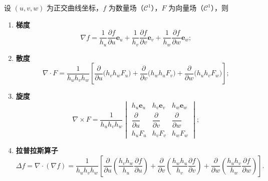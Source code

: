 \begin{theorem}[微分算子的一般公式]
设 \((u,v,w)\) 为正交曲线坐标，\(f\) 为数量场（\(\mathcal C^1\)），\(F\) 为向量场（\(\mathcal C^1\)），则
\begin{enumerate}[label=(\arabic*)]
  \item \textbf{梯度}
  \[
  \nabla f=\frac{1}{h_u}\frac{\partial f}{\partial u}\mathbf e_u
  +\frac{1}{h_v}\frac{\partial f}{\partial v}\mathbf e_v
  +\frac{1}{h_w}\frac{\partial f}{\partial w}\mathbf e_w ;
  \]
  \item \textbf{散度}
  \[
  \nabla\cdot F=\frac{1}{h_uh_vh_w}\left[
  \frac{\partial}{\partial u}\bigl(h_vh_wF_u\bigr)
  +\frac{\partial}{\partial v}\bigl(h_wh_uF_v\bigr)
  +\frac{\partial}{\partial w}\bigl(h_uh_vF_w\bigr)\right];
  \]
  \item \textbf{旋度}
  \[
  \nabla\times F=\frac{1}{h_uh_vh_w}
  \begin{vmatrix}
  h_u\mathbf e_u & h_v\mathbf e_v & h_w\mathbf e_w\\[3pt]
  \dfrac{\partial}{\partial u} & \dfrac{\partial}{\partial v} & \dfrac{\partial}{\partial w}\\[6pt]
  h_uF_u & h_vF_v & h_wF_w
  \end{vmatrix};
  \]
  \item \textbf{拉普拉斯算子}
  \[
  \Delta f=\nabla\cdot(\nabla f)
  =\frac{1}{h_uh_vh_w}\left[
  \frac{\partial}{\partial u}\!\left(\frac{h_vh_w}{h_u}\frac{\partial f}{\partial u}\right)
  +\frac{\partial}{\partial v}\!\left(\frac{h_wh_u}{h_v}\frac{\partial f}{\partial v}\right)
  +\frac{\partial}{\partial w}\!\left(\frac{h_uh_v}{h_w}\frac{\partial f}{\partial w}\right)\right].
  \]
\end{enumerate}
\end{theorem}


